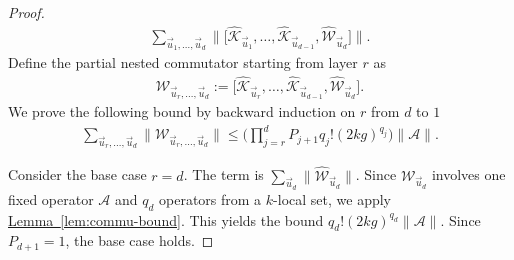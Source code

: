 \documentclass[11pt]{article}
\newcommand{\lem}[1]{\hyperref[lem:#1]{Lemma~\ref*{lem:#1}}}
\newcommand{\mc}{\mathcal}
\begin{document}
\begin{proof}
\begin{align*}
        \sum_{\vec{u}_{1}, \ldots, \vec{u}_{d}} \bigg\| \Big[ \hat{\mathcal{K}}_{\vec{u}_1}, \ldots, \hat{\mathcal{K}}_{\vec{u}_{d-1}}, 
        \hat{\mathcal{W}}_{\vec{u}_d} \Big] \bigg\|.
    \end{align*}
    Define the partial nested commutator starting from layer $r$ as
    \begin{align*}
        \mathcal{W}_{\vec{u}_{r}, \ldots, \vec{u}_d} := \Big[ \hat{\mathcal{K}}_{\vec{u}_r}, \ldots, \hat{\mathcal{K}}_{\vec{u}_{d-1}}, \hat{\mathcal{W}}_{\vec{u}_d} \Big].
    \end{align*}
    We prove the following bound by backward induction on $r$ from $d$ to $1$
    \begin{align} \label{eq:induct-W}
        \sum_{\vec{u}_{r}, \ldots, \vec{u}_{d}} \Big\|\mathcal{W}_{\vec{u}_{r}, \ldots, \vec{u}_d}\Big\|\le \bigg(\prod_{j=r}^{d}P_{j+1} q_j!(2kg)^{q_j}\bigg)\|\mc A\|.
    \end{align}
    
    Consider the base case $r=d$. The term is $\sum_{\vec{u}_d} \|\hat{\mathcal{W}}_{\vec{u}_d}\|$. Since $\mathcal{W}_{\vec{u}_d}$ involves one fixed operator $\mathcal{A}$ and $q_d$ operators from a $k$-local set, we apply \lem{commu-bound}. This yields the bound $q_d!(2kg)^{q_d}\|\mathcal{A}\|$. Since $P_{d+1}=1$, the base case holds.


\end{proof}
\end{document}
